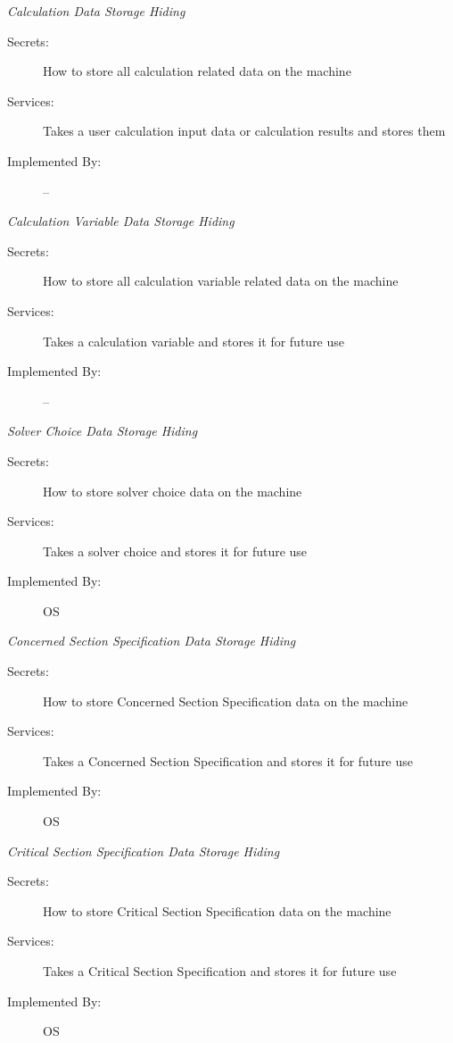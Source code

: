 \documentclass[12pt, titlepage]{article}
\begin{document}
    \emph{{\large Calculation Data Storage Hiding}}
    \begin{description}
        \item[Secrets:] How to store all calculation related data on the machine
        \item[Services:]Takes a user calculation input data or calculation results and stores them 
        \item[Implemented By:] --\\
    \end{description}
    \emph{{\large Calculation Variable Data Storage Hiding}}
    \begin{description}
        \item[Secrets:] How to store all calculation variable related data on the machine
        \item[Services:]Takes a calculation variable and stores it for future use
        \item[Implemented By:] --\\
    \end{description}
    \emph{{\large Solver Choice Data Storage Hiding}}
    \begin{description}
        \item[Secrets:] How to store solver choice data on the machine
        \item[Services:]Takes a solver choice and stores it for future use
        \item[Implemented By:] OS\\
    \end{description}
    \emph{{\large Concerned Section Specification Data Storage Hiding}}
    \begin{description}
        \item[Secrets:] How to store Concerned Section Specification data on the machine
        \item[Services:]Takes a Concerned Section Specification and stores it for future use
        \item[Implemented By:] OS\\
    \end{description}
    \emph{{\large Critical Section Specification Data Storage Hiding}}
    \begin{description}
        \item[Secrets:] How to store Critical Section Specification data on the machine
        \item[Services:]Takes a Critical Section Specification and stores it for future use
        \item[Implemented By:] OS\\
    \end{description}
\end{document}
